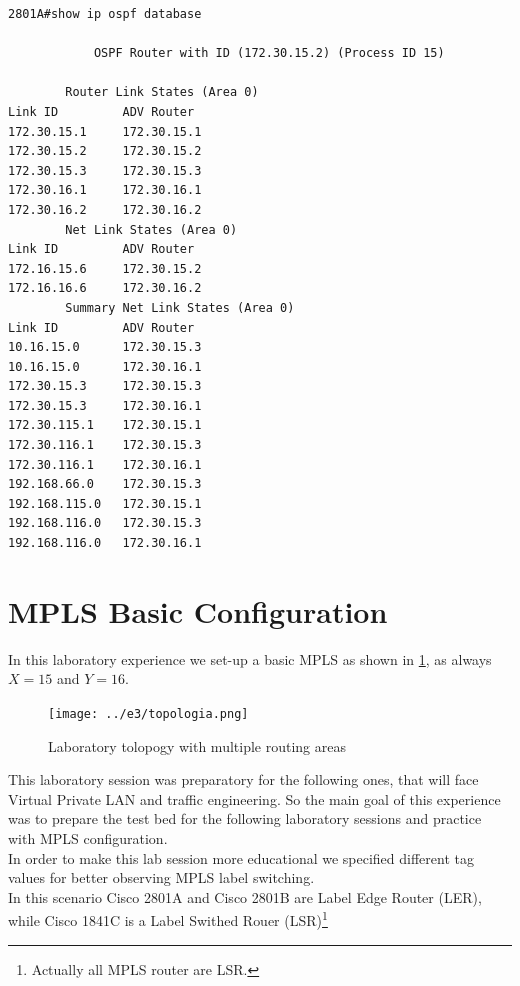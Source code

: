 \documentclass{llncs}
\newcommand{\labelsec}[1]{\label{sec:#1}}
\begin{document}
\lstset{language=sh, caption=OSPF database of backbone router Cisco 2801A, basicstyle=\ttfamily\scriptsize , breaklines=true}
\begin{lstlisting}
2801A#show ip ospf database 

            OSPF Router with ID (172.30.15.2) (Process ID 15)

		Router Link States (Area 0)
Link ID         ADV Router      
172.30.15.1     172.30.15.1     
172.30.15.2     172.30.15.2     
172.30.15.3     172.30.15.3     
172.30.16.1     172.30.16.1   
172.30.16.2     172.30.16.2    
		Net Link States (Area 0)
Link ID         ADV Router    
172.16.15.6     172.30.15.2   
172.16.16.6     172.30.16.2   
		Summary Net Link States (Area 0)
Link ID         ADV Router     
10.16.15.0      172.30.15.3
10.16.15.0      172.30.16.1
172.30.15.3     172.30.15.3
172.30.15.3     172.30.16.1
172.30.115.1    172.30.15.1
172.30.116.1    172.30.15.3
172.30.116.1    172.30.16.1
192.168.66.0    172.30.15.3
192.168.115.0   172.30.15.1
192.168.116.0   172.30.15.3
192.168.116.0   172.30.16.1
\end{lstlisting}

\section{MPLS Basic Configuration}
\labelsec{MPLS_basic}

In this laboratory experience we set-up a basic MPLS as shown in \ref{fig:mpls1_topology}, as always $X=15$ and $Y=16$. 

\begin{figure}
\centering
\texttt{[image: ../e3/topologia.png]}
\caption{Laboratory tolopogy with multiple routing areas}
\label{fig:mpls1_topology}
\end{figure}

This laboratory session was preparatory for the following ones, that will face Virtual Private LAN and traffic engineering. So the main goal of this experience was to prepare the test bed for the following laboratory sessions and practice with MPLS configuration.\\
In order to make this lab session more educational we specified different tag values for better observing MPLS label switching.\\
In this scenario Cisco 2801A and Cisco 2801B are Label Edge Router (LER), while Cisco 1841C is a Label Swithed Rouer (LSR)\footnote{Actually all MPLS router are LSR.}\\
\end{document}
